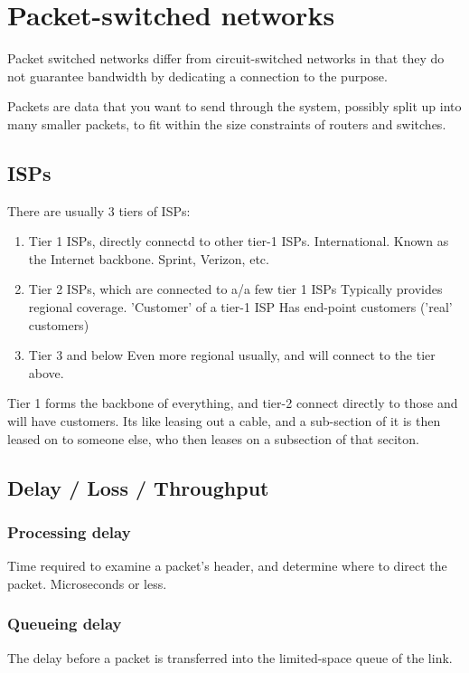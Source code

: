 \section{Packet-switched networks}
Packet switched networks differ from circuit-switched
networks in that they do not guarantee bandwidth by dedicating
a connection to the purpose. 

Packets are data that you want to send through the system, possibly
split up into many smaller packets, to fit within the size constraints
of routers and switches.

\subsection{ISPs}
There are usually 3 tiers of ISPs:
\begin{enumerate}
    \item Tier 1 ISPs, directly connectd to other tier-1 ISPs. International.
        \subitem Known as the Internet backbone. Sprint, Verizon, etc.
    \item Tier 2 ISPs, which are connected to a/a few tier 1 ISPs
        \subitem Typically provides regional coverage.
        \subitem 'Customer' of a tier-1 ISP
        \subitem Has end-point customers ('real' customers)
    \item Tier 3 and below
        \subitem Even more regional usually, and will connect to the tier
        above.
\end{enumerate}

Tier 1 forms the backbone of everything, and tier-2 connect directly to those
and will have customers. Its like leasing out a cable, and a sub-section of it
is then leased on to someone else, who then leases on a subsection of that seciton.

\subsection{Delay / Loss / Throughput}
\subsubsection{Processing delay}
Time required to examine a packet's header, and determine where to direct the
packet. Microseconds or less.

\subsubsection{Queueing delay}
The delay before a packet is transferred into the limited-space queue of the
link. 

